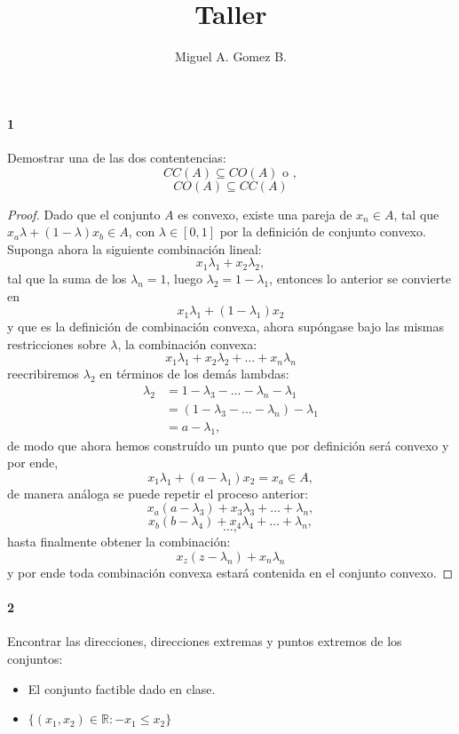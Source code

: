 \documentclass{article}
\title{Taller}
\author{Miguel A. Gomez B.}
\begin{document}
	\maketitle
\paragraph{1} Demostrar una de las dos contentencias:
$$CC(A) \subseteq CO(A) \text{ o },$$
$$CO(A) \subseteq CC(A)$$
\begin{proof} Dado que el conjunto $A$ es convexo, existe una pareja de $x_n \in A$, tal que $x_a\lambda + (1-\lambda)x_b \in A$, con $\lambda \in [0,1]$ por la definición de conjunto convexo. Suponga ahora la siguiente combinación lineal:
	$$x_1\lambda_1 + x_2\lambda_2,$$
tal que la suma de los $\lambda_n = 1$, luego $\lambda_2 = 1 - \lambda_1$, entonces lo anterior se convierte en
$$x_1\lambda_1 + (1-\lambda_1) x_2$$
y que es la definición de combinación convexa, ahora supóngase bajo las mismas restricciones sobre $\lambda$, la combinación convexa:
$$x_1\lambda_1 + x_2\lambda_2 + \dots + x_n\lambda_n$$
reecribiremos $\lambda_2$ en términos de los demás lambdas:
\begin{align*}
	\lambda_2 &= 1 - \lambda_3 - \dots - \lambda_n - \lambda_1\\
	&= (1 - \lambda_3 - \dots - \lambda_n) - \lambda_1\\
	&= a - \lambda_1,
\end{align*}
de modo que ahora hemos construído un punto que por definición será convexo y por ende,
$$ x_1\lambda_1 + (a - \lambda_1)x_2 = x_a \in A,$$
de manera análoga se puede repetir el proceso anterior:
$$x_a(a-\lambda_3) + x_3 \lambda_3 + \dots + \lambda_n,$$
$$x_b(b-\lambda_4) + x_4 \lambda_4 + \dots + \lambda_n,$$
$$\dots,$$
hasta finalmente obtener la combinación:
$$x_z(z-\lambda_n) + x_n \lambda_n$$
y por ende toda combinación convexa estará contenida en el conjunto convexo.
\end{proof}
\paragraph{2} Encontrar las direcciones, direcciones extremas y puntos extremos de los conjuntos:
\begin{itemize}
	\item El conjunto factible dado en clase.
	\item $\{(x_1, x_2) \in \mathbb{R}: -x_1 \leq x_2\}$
\end{itemize}
\end{document}
